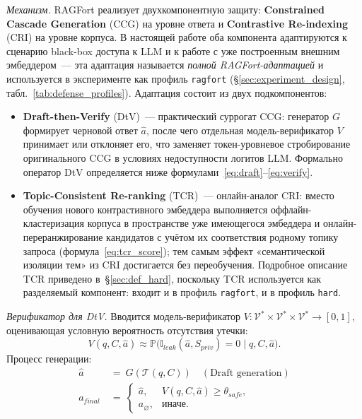 \documentclass[12pt, a4paper]{article}
\theoremstyle{definition}
\theoremstyle{remark}
\begin{document}
\textit{Механизм.} RAGFort \cite{RAGFort2025} реализует двухкомпонентную защиту: \textbf{Constrained Cascade Generation} (CCG) на уровне ответа и \textbf{Contrastive Re-indexing} (CRI) на уровне корпуса. В настоящей работе оба компонента адаптируются к сценарию black-box доступа к LLM и к работе с уже построенным внешним эмбеддером~--- эта адаптация называется \emph{полной RAGFort-адаптацией} и используется в эксперименте как профиль \texttt{ragfort} (\S\ref{sec:experiment_design}, табл.~\ref{tab:defense_profiles}). Адаптация состоит из двух подкомпонентов:
\begin{itemize}[label=$\circ$]
    \item \textbf{Draft-then-Verify} (DtV)~--- практический суррогат CCG: генератор $G$ формирует черновой ответ $\hat{a}$, после чего отдельная модель-верификатор $V$ принимает или отклоняет его, что заменяет токен-уровневое стробирование оригинального CCG в условиях недоступности логитов LLM. Формально оператор DtV определяется ниже формулами~\eqref{eq:draft}--\eqref{eq:verify}.
    \item \textbf{Topic-Consistent Re-ranking} (TCR)~--- онлайн-аналог CRI: вместо обучения нового контрастивного эмбеддера выполняется оффлайн-кластеризация корпуса в пространстве уже имеющегося эмбеддера и онлайн-переранжирование кандидатов с учётом их соответствия родному топику запроса (формула~\eqref{eq:tcr_score}); тем самым эффект «семантической изоляции тем» из CRI достигается без переобучения. Подробное описание TCR приведено в~\S\ref{sec:def_hard}, поскольку TCR используется как разделяемый компонент: входит и в профиль \texttt{ragfort}, и в профиль \texttt{hard}.
\end{itemize}

\textit{Верификатор для DtV.} Вводится модель-верификатор $V: \mathcal{V}^* \times \mathcal{V}^* \times \mathcal{V}^* \to [0, 1]$, оценивающая условную вероятность отсутствия утечки:
\begin{equation}
    V(q, C, \hat{a}) \approx \mathbb{P}\bigl(\mathbb{I}_{leak}(\hat{a}, S_{priv}) = 0 \mid q, C, \hat{a}\bigr).
\end{equation}
Процесс генерации:
\begin{align}
    \hat{a}\ &=\ G(\mathcal{T}(q, C)) \quad (\text{Draft generation}) \label{eq:draft}\\
    a_{final}\ &=\
    \begin{cases}
      \hat{a}, & V(q, C, \hat{a}) \ge \theta_{safe}, \\
      a_\varnothing, & \text{иначе.}
    \end{cases}
    \label{eq:verify}
\end{align}
\end{document}
